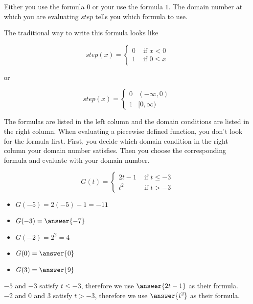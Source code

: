 \documentclass{ximera}
\begin{document}
Either you use the formula $0$ or your use the formula $1$.  The domain number at which you are evaluating $step$ tells you which formula to use.


The traditional way to write this formula looks like

\[
step(x) = 
\begin{cases}
  0 & \text{ if } x < 0 \\
  1 & \text{ if } 0 \leq x
\end{cases}
\]


or


\[
step(x) = 
\begin{cases}
  0 & (-\infty, 0) \\
  1 & [0, \infty)
\end{cases}
\]




The formulas are listed in the left column and the domain conditions are listed in the right column.  When evaluating a piecewise defined function, you don't look for the formula first.  First, you decide which domain condition in the right column your domain number satisfies.  Then you choose the corresponding formula and evaluate with your domain number.











\begin{example}

\[
G(t) = 
\begin{cases}
  2t-1 & \text{ if } t \leq -3 \\
  t^2 & \text{ if } t > -3
\end{cases}
\]


\begin{itemize}
\item $G(-5) = 2(-5) - 1 = -11$  
\item $G(-3) = \answer{-7}$ 
\item $G(-2) = 2^2 = 4$ 
\item $G(0) = \answer{0}$ 
\item $G(3) = \answer{9}$ 
\end{itemize}


$-5$ and $-3$ satisfy $t \leq -3$, therefore we use $\answer{2t-1}$ as their formula. \\
$-2$ and $0$ and $3$ satisfy $t > -3$, therefore we use $\answer{t^2}$ as their formula. \\

\end{example}
\end{document}
